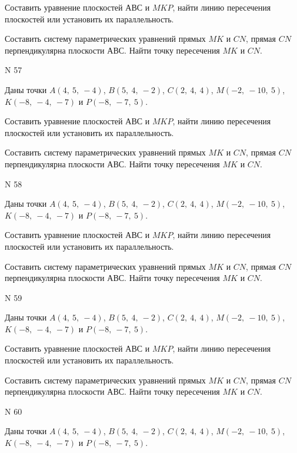 \documentclass[11pt]{report}
\begin{document}
Составить уравнение плоскостей $АВС$ и $MKP$,
найти линию пересечения плоскостей или установить их параллельность.

Составить систему параметрических уравнений прямых $MK$ и $CN$,
прямая $CN$ перпендикулярна плоскости $АВС$. 
Найти точку пересечения $MK$ и $CN$.



 N 57

Даны точки $A\left( 4, \  5, \  -4\right)$, $B\left( 5, \  4, \  -2\right)$, $C\left( 2, \  4, \  4\right)$, $M\left( -2, \  -10, \  5\right)$, $K\left( -8, \  -4, \  -7\right)$ и $P\left( -8, \  -7, \  5\right)$.


Составить уравнение плоскостей $АВС$ и $MKP$,
найти линию пересечения плоскостей или установить их параллельность.

Составить систему параметрических уравнений прямых $MK$ и $CN$,
прямая $CN$ перпендикулярна плоскости $АВС$. 
Найти точку пересечения $MK$ и $CN$.



 N 58

Даны точки $A\left( 4, \  5, \  -4\right)$, $B\left( 5, \  4, \  -2\right)$, $C\left( 2, \  4, \  4\right)$, $M\left( -2, \  -10, \  5\right)$, $K\left( -8, \  -4, \  -7\right)$ и $P\left( -8, \  -7, \  5\right)$.


Составить уравнение плоскостей $АВС$ и $MKP$,
найти линию пересечения плоскостей или установить их параллельность.

Составить систему параметрических уравнений прямых $MK$ и $CN$,
прямая $CN$ перпендикулярна плоскости $АВС$. 
Найти точку пересечения $MK$ и $CN$.



 N 59

Даны точки $A\left( 4, \  5, \  -4\right)$, $B\left( 5, \  4, \  -2\right)$, $C\left( 2, \  4, \  4\right)$, $M\left( -2, \  -10, \  5\right)$, $K\left( -8, \  -4, \  -7\right)$ и $P\left( -8, \  -7, \  5\right)$.


Составить уравнение плоскостей $АВС$ и $MKP$,
найти линию пересечения плоскостей или установить их параллельность.

Составить систему параметрических уравнений прямых $MK$ и $CN$,
прямая $CN$ перпендикулярна плоскости $АВС$. 
Найти точку пересечения $MK$ и $CN$.



 N 60

Даны точки $A\left( 4, \  5, \  -4\right)$, $B\left( 5, \  4, \  -2\right)$, $C\left( 2, \  4, \  4\right)$, $M\left( -2, \  -10, \  5\right)$, $K\left( -8, \  -4, \  -7\right)$ и $P\left( -8, \  -7, \  5\right)$.
\end{document}
